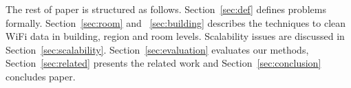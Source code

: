 The rest of paper is structured as follows. Section~\ref{sec:def} defines problems formally. Section~\ref{sec:room} and ~\ref{sec:building} describes the techniques to clean WiFi data in building, region and room levels. Scalability issues are discussed in Section~\ref{sec:scalability}. Section~\ref{sec:evaluation} evaluates our methods, Section~\ref{sec:related} presents the related work and Section~\ref{sec:conclusion} concludes paper. 
